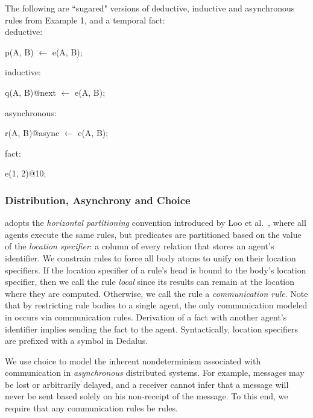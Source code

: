 \begin{example}
The following are ``sugared" versions of deductive, inductive and asynchronous rules from Example 1, and a temporal fact:
\\
deductive:
\begin{Dedalus}
p(A, B) \(\leftarrow\) e(A, B);
\end{Dedalus}
inductive:
\begin{Dedalus}
q(A, B)@next \(\leftarrow\) e(A, B);
\end{Dedalus}
asynchronous:
\begin{Dedalus}
r(A, B)@async \(\leftarrow\) e(A, B);
\end{Dedalus}
fact:
\begin{Dedalus}
e(1, 2)@10;
\end{Dedalus}

\end{example}

\subsubsection{Distribution, Asynchrony and Choice}

\lang adopts the {\em horizontal partitioning} convention introduced by Loo et
al.~\cite{Loo:2005}, where all agents execute the same rules, but predicates
are partitioned based on the value of the {\em location specifier}: a column of
every relation that stores an agent's identifier.  We constrain \lang rules to
force all body atoms to unify on their location specifiers.  If the location
specifier of a rule's head is bound to the body's location specifier, then we
call the rule {\em local} since its results can remain at the location where
they are computed.  Otherwise, we call the rule a {\em communication rule}.
Note that by restricting rule bodies to a single agent, the only communication
modeled in \lang occurs via communication rules.  Derivation of a fact with
another agent's identifier implies sending the fact to the agent.
Syntactically, location specifiers are prefixed with a \dedalus{\#} symbol in
Dedalus.

We use choice to model the inherent nondeterminism associated with
communication in {\em asynchronous} distributed systems.  For example, messages
may be lost or arbitrarily delayed, and a receiver cannot infer that a message
will never be sent based solely on his non-receipt of the message.  To this
end, we require that any communication rules be  rules.


